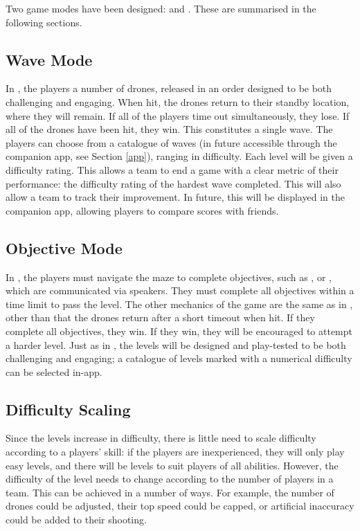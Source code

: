 \documentclass{report_template_oxford}
\begin{document}
\noindent Two game modes have been designed:  and . These are summarised in the following sections.
\subsection{Wave Mode}
In , the players  a number of drones, released in an order designed to be both challenging and engaging. When hit, the drones return to their standby location, where they will remain. If all of the players time out simultaneously, they lose. If all of the drones have been hit, they win. This constitutes a single wave. The players can choose from a catalogue of waves (in future accessible through the companion app, see Section \ref{app}), ranging in difficulty. Each level will be given a difficulty rating. This allows a team to end a game with a clear metric of their performance: the difficulty rating of the hardest wave completed. This will also allow a team to track their improvement. In future, this will be displayed in the companion app, allowing players to compare scores with friends.

\subsection{Objective Mode}
In , the players must navigate the maze to complete objectives, such as , or , which are communicated via speakers. They must complete all objectives within a time limit to pass the level. The other mechanics of the game are the same as in , other than that the drones return after a short timeout when hit. If they complete all objectives, they win. If they win, they will be encouraged to attempt a harder level. Just as in , the levels will be designed and play-tested to be both challenging and engaging; a catalogue of levels marked with a numerical difficulty can be selected in-app.\newline

\subsection{Difficulty Scaling}
Since the levels increase in difficulty, there is little need to scale difficulty according to a players' skill: if the players are inexperienced, they will only play easy levels, and there will be levels to suit players of all abilities. However, the difficulty of the level needs to change according to the number of players in a team. This can be achieved in a number of ways. For example, the number of drones could be adjusted, their top speed could be capped, or artificial inaccuracy could be added to their shooting.\newline
\end{document}
